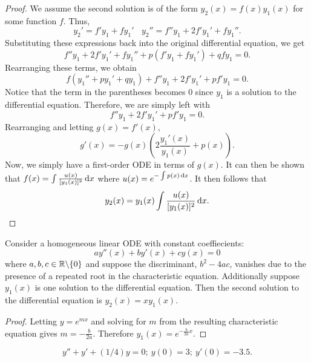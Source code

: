\begin{proof}
    We assume the second solution is of the form $y_2(x) = f(x)y_1(x)$ for
    some function $f$. Thus,
    $$y_2' = f'y_1+fy_1'~~~~y_2'' = f''y_1+2f'y_1'+fy_1''.$$
    Substituting these expressions back into the original differential
    equation, we get
    $$f''y_1+2f'y_1'+fy_1''+p(f'y_1+fy_1')+qfy_1 = 0.$$ Rearranging these
    terms, we obtain $$f(y_1''+py_1'+qy_1)+f''y_1+2f'y_1'+pf'y_1 = 0.$$ Notice
    that the term in the parentheses becomes $0$ since $y_1$ is a solution
    to the differential equation. Therefore, we are simply left with
    $$f''y_1+2f'y_1'+pf'y_1 = 0.$$ Rearranging and letting $g(x) = f'(x)$,
    $$g'(x) = -g(x)\left(2\frac{y_1'(x)}{y_1(x)}+p(x)\right).$$ Now, we simply
    have a first-order ODE in terms of $g(x)$. It can then be shown that
    $f(x) = \int \frac{u(x)}{[y_1(x)]^2} \dif x$ where 
    $u(x) = e^{-\int p(x) \dif x}$. It then follows that
    $$y_2(x) = y_1(x)\int \frac{u(x)}{[y_1(x)]^2} \dif x.$$
\end{proof}
\begin{corollary}
    Consider a homogeneous linear ODE with constant coeffiecients:
    $$ay''(x)+by'(x)+cy(x) = 0$$ where $a,b,c \in \mathbb R \text{\textbackslash} \{0\}$ and suppose the 
    discriminant, $b^2-4ac$, vanishes due to the presence of a repeated
    root in the characteristic equation. Additionally suppose $y_1(x)$ is 
    one solution to the differential equation. Then the second solution to the
    differential equation is $y_2(x) = xy_1(x)$.
\end{corollary}
\begin{proof}
    Letting $y=e^{mx}$ and solving for $m$ from the resulting characteristic
    equation gives $m = -\frac{b}{2a}$. Therefore $y_1(x) = e^{-\frac{b}{2a}x}$.
\end{proof}
\begin{example}
    $$y''+y'+(1/4)y=0;~y(0) = 3; ~ y'(0) = -3.5.$$
\end{example}
